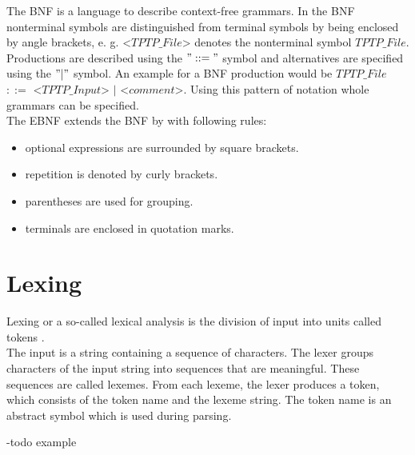 The \acf{BNF} is a language to describe context-free grammars.
In the \acf{BNF} nonterminal symbols are distinguished from terminal symbols by being enclosed by  angle brackets, e. g. <$TPTP\_File$> denotes the nonterminal symbol $TPTP\_File$.
Productions are described using the $"::="$ symbol and alternatives are specified using the $"|"$ symbol. \cite{BNF.1964}
An example for a \ac{BNF} production would be $TPTP\_File$ $::=$ <$TPTP\_Input$> $|$ <$comment$>.
Using this pattern of notation whole grammars can be specified.\\
The \ac{EBNF} extends the \ac{BNF} by with following rules:

\begin{itemize}%
	\item optional expressions are surrounded by square brackets.
	\item repetition is denoted by curly brackets.
	\item parentheses are used for grouping.
	\item terminals are enclosed in quotation marks.
\end{itemize}
\label{itemize:BackgroundBNF}
\cite{EBNF.1977}

\section{Lexing}\label{sec:BackgroundLexer}

Lexing or a so-called lexical analysis is the division of input into units called tokens \cite{LexYacc.1992}.\\
The input is a string containing a sequence of characters.
The lexer groups characters of the input string into sequences that are meaningful. These sequences are called lexemes. From each lexeme, the lexer produces a token, which consists of the token name and the lexeme string. The token name is an abstract symbol which is used during parsing. \cite{Aho.2007}

-todo example

